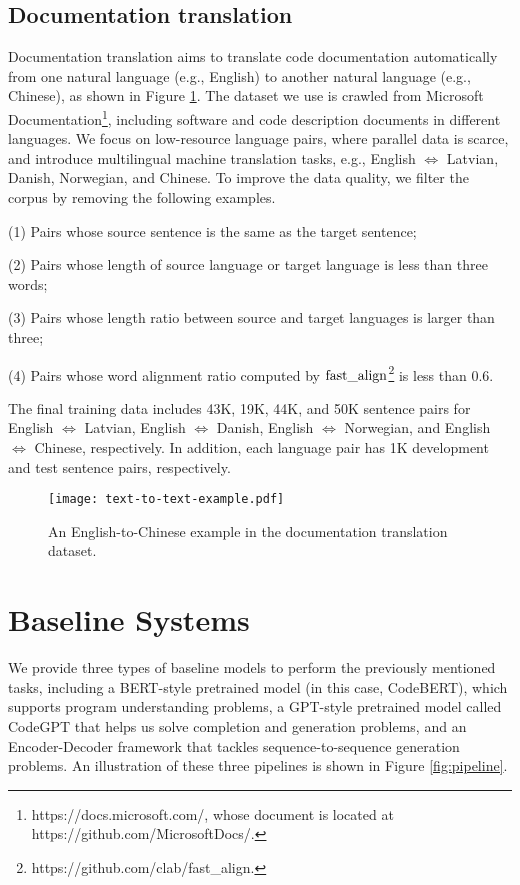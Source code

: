 \documentclass[sigconf,nonacm,screen]{acmart}
\begin{document}
\subsection{Documentation translation}
Documentation translation aims to translate code documentation automatically from one natural language (e.g., English) to another natural language (e.g., Chinese), as shown in Figure \ref{fig:text2text}.
The dataset we use is crawled  from Microsoft Documentation\footnote{https://docs.microsoft.com/, whose document is located at https://github.com/MicrosoftDocs/.}, including software and code description documents in different languages.
We focus on low-resource language pairs, where parallel
data is scarce, and introduce multilingual machine translation tasks, e.g., English $\Leftrightarrow$ Latvian, Danish, Norwegian, and Chinese.
To improve the data quality, we filter the corpus by removing the following examples.

(1) Pairs whose source sentence is the same as the target sentence;

(2) Pairs whose length of source language or target language is less than three words;

(3) Pairs whose length ratio between source and target languages is larger than three; 

(4) Pairs whose word alignment ratio computed by $\rm{fast\_align}$\footnote{https://github.com/clab/fast\_align.} is less than 0.6. 

The final
training data includes 43K, 19K, 44K, and 50K sentence pairs for English $\Leftrightarrow$ Latvian, English $\Leftrightarrow$ Danish, English $\Leftrightarrow$ Norwegian, and English $\Leftrightarrow$ Chinese, respectively. In addition, each language pair has 1K development and test sentence pairs, respectively.

\begin{figure}[t]
    \texttt{[image: text-to-text-example.pdf]}
    \caption{An English-to-Chinese example in the documentation translation dataset.}
    \label{fig:text2text}
\end{figure}





\section{Baseline Systems}
We provide three types of baseline models to perform the  previously mentioned tasks, including a BERT-style pretrained model (in this case, CodeBERT), which supports program understanding problems,   a GPT-style pretrained model called CodeGPT that helps us solve completion and generation problems, and an Encoder-Decoder framework that tackles sequence-to-sequence generation problems. 
An illustration of these three pipelines is shown in Figure \ref{fig:pipeline}. 
\end{document}
